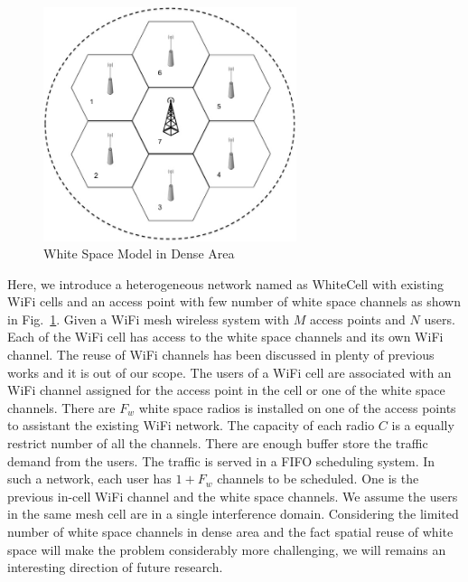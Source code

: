 \begin{figure}
\vspace{-0.0in}
\centering
\includegraphics[width=74mm]{figures/whitecell}
\vspace{-0.1in}
\caption{White Space Model in Dense Area}
\label{fig:systemmodel}
\vspace{-0.1in}
\end{figure}


Here, we introduce a heterogeneous network named as WhiteCell with existing WiFi cells and an access point 
with few number of white space channels as shown in Fig.~\ref{fig:systemmodel}.
Given a WiFi mesh wireless system with $M$ access points and $N$ users.
Each of the WiFi cell has access to the white space channels and its own WiFi channel. The reuse of 
WiFi channels has been discussed in plenty of previous works and it is out of our scope.
The users of a WiFi cell are associated with an WiFi channel assigned for the access point in the cell or one of 
the white space channels. 
There are $F_w$ white space radios is installed on one of the access points to assistant the existing WiFi 
network. 
The capacity of each radio $C$ is a equally restrict number of all the channels. There are enough buffer 
store the traffic demand from the users. 
The traffic is served in a FIFO scheduling system. 
In such a network, each user has $1+F_w$ channels to be scheduled. One is the previous in-cell WiFi channel 
and the white space channels. 
We assume the users in the same mesh cell are in a single interference domain. 
Considering the limited number of white space channels in dense area and the fact spatial reuse 
of white space will make the problem considerably more challenging, we will remains an interesting 
direction of future research. 


